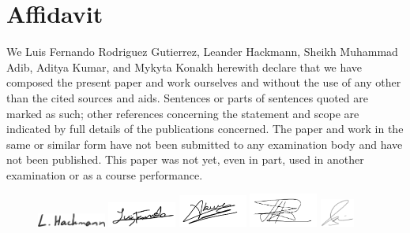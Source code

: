 \section*{Affidavit}

We Luis Fernando Rodriguez Gutierrez, Leander Hackmann, Sheikh Muhammad Adib, Aditya Kumar, and Mykyta Konakh herewith declare that we have composed the present paper and work ourselves and without the use of any other than the cited sources and aids. Sentences or parts of sentences quoted are marked as such; other references concerning the statement and scope are indicated by full details of the publications concerned. The paper and work in the same or similar form have not been submitted to any examination body and have not been published. This paper was not yet, even in part, used in another examination or as a course performance.
\begin{figure}[ht]
    \includegraphics[width=0.2\textwidth]{images/lh_signature_fh_do.png}
    \includegraphics[width=0.2\textwidth]{images/LF_RoGusignature.png}
    \includegraphics[width=0.2\textwidth]{images/Aditya_signature.png}
    \includegraphics[width=0.2\textwidth]{images/mykyta_signature.png}
    \includegraphics[width=0.1\textwidth]{images/sheikh_signature.png}
\end{figure}
